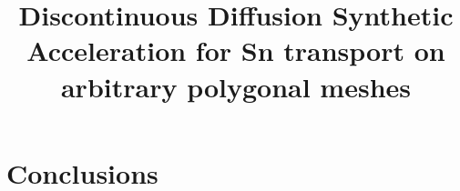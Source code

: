 \documentclass{article}
\renewcommand{\(}{\left(}
\renewcommand{\)}{\right)}
\renewcommand{\[}{\left[}
\renewcommand{\]}{\right]}
\begin{document}
\title{Discontinuous Diffusion Synthetic Acceleration for Sn transport on
arbitrary polygonal meshes}
\author{} 
\date{}
\maketitle









\section{Conclusions}





\end{document}
